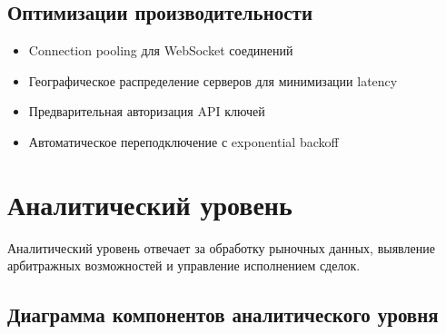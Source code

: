 \documentclass[a4paper,11pt]{article}
\begin{document}
\subsection{Оптимизации производительности}

\begin{itemize}
    \item Connection pooling для WebSocket соединений
    \item Географическое распределение серверов для минимизации latency
    \item Предварительная авторизация API ключей
    \item Автоматическое переподключение с exponential backoff
\end{itemize}

\newpage

\section{Аналитический уровень}

Аналитический уровень отвечает за обработку рыночных данных, выявление арбитражных возможностей и управление исполнением сделок.

\subsection{Диаграмма компонентов аналитического уровня}
\end{document}

